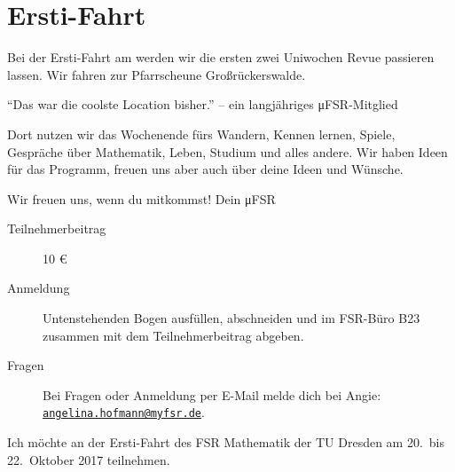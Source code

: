 \section*{Ersti-Fahrt}
\label{sec:ersti_fahrt}
Bei der Ersti-Fahrt am 
werden wir die ersten zwei Uniwochen Revue passieren lassen.
Wir fahren zur Pfarrscheune Großrückerswalde.
\begin{flushright}
  \enquote{Das war die coolste Location bisher.} -- ein langjähriges μFSR-Mitglied
\end{flushright}
Dort nutzen wir das Wochenende fürs Wandern, Kennen lernen, Spiele, Gespräche über Mathematik, Leben, Studium und
alles andere. Wir haben Ideen für das Programm, freuen uns aber auch über deine Ideen und Wünsche.

Wir freuen uns, wenn du mitkommst!
\hfill Dein μFSR

\vspace{1em}
\begin{description}
  \item[Teilnehmerbeitrag] 10 €
  \item[Anmeldung] Untenstehenden Bogen ausfüllen, abschneiden und im FSR-Büro B23 zusammen mit dem Teilnehmerbeitrag abgeben.
  \item[Fragen] Bei Fragen oder Anmeldung per E-Mail melde dich bei Angie: \href{mailto:angelina.hofmann@myfsr.de}{\nolinkurl{angelina.hofmann@myfsr.de}}. 
\end{description}
\vspace{5em}
Ich möchte an der Ersti-Fahrt des FSR Mathematik der TU Dresden am 20.\ bis 22.\ Oktober 2017 teilnehmen.
\newcommand{\tofillline}[1]{\item[#1:] \hrulefill}
\begin{description}[itemsep=3em, topsep=3em]
  \tofillline{Name}
  \tofillline{Wünsche/ Bedarf bezüglich Ernährung}
  \tofillline{sonstige Anmerkungen}
  \tofillline{Datum, Unterschrift}
  \tofillline{Unterschrift für gezahlten Teilnehmerbeitrag}
\end{description}
